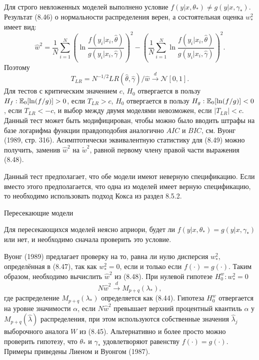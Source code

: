 Для строго невложенных моделей выполнено условие $f(y|x, \theta_*) \not= g(y|x, \gamma_*)$. Результат (8.46) о нормальности распределения верен, а состоятельная оценка $w_*^2$ имеет вид:
\begin{equation}
\hat{w}^2 = \frac{1}{N} \sum_{i=1}^N \left( \ln \frac{f(y_i|x_i, \hat{\theta})}{g(y_i|x_i, \hat{\gamma})} \right)^2 - \left( \frac{1}{N} \sum_{i=1}^N \ln \frac{f(y_i|x_i, \hat{\theta})}{g(y_i|x_i, \hat{\gamma})} \right)^2.
\end{equation}
Поэтому
\begin{equation}
T_{LR} = N^{-1/2}LR(\hat{\theta}, \hat{\gamma})/\hat{w} \stackrel{d}{\rightarrow} \mathcal{N}[0,1].
\end{equation}
Для тестов с критическим значением $c$, $H_0$ отвергается в пользу $H_f: \mathbb{E}_0[\ln (f/g)] > 0$, если $T_{LR} > c$, $H_0$ отвергается в пользу $H_g: \mathbb{E}_0[\ln (f/g)] < 0$, если $T_{LR} < - c$, и выбор между двумя моделями невозможен, если $|T_{LR}| < c$. Данный тест может быть модифицирован, чтобы можно было вводить штрафы на базе логарифма функции правдоподобия аналогично $AIC$ и $BIC$, см. Вуонг (1989, стр. 316). Асимптотически эквивалентную статистику для (8.49) можно получить, заменив $\hat{w}^2$ на $\tilde{w}^2$, равной первому члену правой части выражения (8.48).

Данный тест предполагает, что обе модели имеют неверную спецификацию. Если вместо этого предполагается, что одна из моделей имеет верную спецификацию, то необходимо использовать подход Кокса из раздел 8.5.2.

\begin{center}
Пересекающие модели
\end{center}

Для пересекающихся моделей неясно априори, будет ли $f(y|x, \theta_*) = g(y|x, \gamma_*)$ или нет, и необходимо сначала проверить это условие.

Вуонг (1989) предлагает проверку на то, равна ли нулю дисперсия $w_*^2$, определённая в (8.47), так как $w_*^2 = 0$, если и только если $f(\cdot) = g(\cdot)$. Таким образом, необходимо вычислить $\hat{w}^2$ из (8.48). При нулевой гипотезе $H_0^w: w_*^2 = 0$
\begin{equation}
N\hat{w}^2 \stackrel{d}{\rightarrow} M_{p + q}(\lambda_*),
\end{equation}
где распределение $M_{p + q}(\lambda_*)$ определяется как (8.44). Гипотеза $H_0^w$ отвергается на уровне значимости $\alpha$, если $N\hat{w}^2$ превышает верхний процентный квантиль $\alpha$ у $M_{p + q}(\hat{\lambda})$ распределения, при этом используются собственные значения $\hat{\lambda}_j$ выборочного аналога $W$ из (8.45). Альтернативно и более просто можно проверить гипотезу, что $\theta_*$ и $\gamma_*$ удовлетворяют равенству $f(\cdot) = g(\cdot)$. Примеры приведены Лиеном и Вуонгом (1987).

